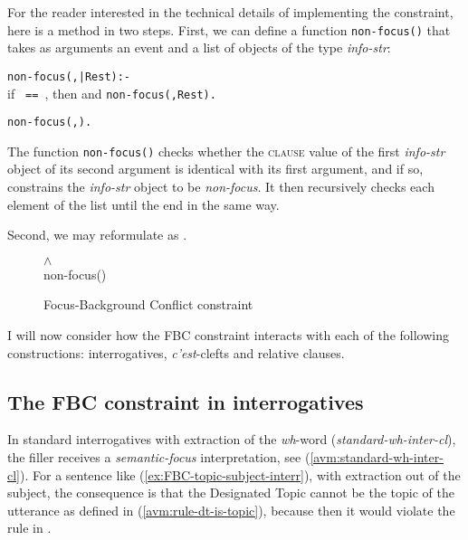For the reader interested in the technical details of implementing the constraint, here is a method in two steps. First, we can define a function \texttt{non-focus()} that takes as arguments an event and a list of objects of the type \emph{info-str}:

\ea \texttt{non-focus(\avm{\1},|Rest):-}\\ 
if \texttt{\avm{\1} == \avm{\3}}, then \texttt{} and \texttt{non-focus(\avm{\1},Rest).}

\texttt{non-focus(\avm{\1},\avm{<>}).}
\z 

The function \texttt{non-focus()} checks whether the \textsc{clause} value of the first \emph{info-str} object of its second argument is identical with its first argument, and if so, constrains the \emph{info-str} object to be \emph{non-focus}. It then recursively checks each element of the list until the end in the same way.

Second, we may reformulate  as .

\begin{figure}[h]
\quad\impl\quad
\parbox[c]{\widthof{non-focus(m, n)}}{\raggedright{} $\wedge$ \\ non-focus()}
\caption{Focus-Background Conflict constraint}\label{avm:rule-FBC-more-exact}
\end{figure}

I will now consider how the FBC constraint interacts with each of the following constructions: interrogatives, \emph{c'est}-clefts and relative clauses.

\subsection{The FBC constraint in interrogatives}

In standard interrogatives with extraction of the \emph{wh}-word (\emph{standard-wh-inter-cl}), the filler receives a \emph{semantic-focus} interpretation, see (\ref{avm:standard-wh-inter-cl}). For a sentence like (\ref{ex:FBC-topic-subject-interr}), with extraction out of the subject, the consequence is that the Designated Topic cannot be the topic of the utterance as defined in (\ref{avm:rule-dt-is-topic}), because then it would violate the rule in . 

